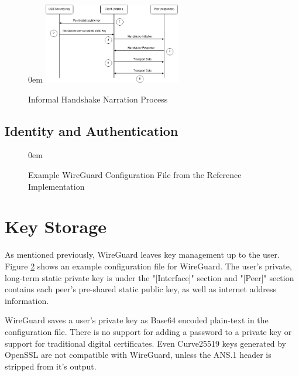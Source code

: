 \documentclass [11pt, proquest] {uwthesis}[2020/02/24]
\begin{document}
\begin{figure}
\itemsep0em 
\includegraphics[width=6cm]{paper/images/Process_Diagram.png}
\caption{Informal Handshake Narration Process}
\label{fig:handshake_process}
\end{figure}

\subsection {Identity and Authentication}
\label{identity}

\begin{figure}
\itemsep0em 
\caption{Example WireGuard Configuration File from the Reference Implementation}
\label{fig:wg_config}
\end{figure}

\section{Key Storage}
As mentioned previously, WireGuard leaves key management up to the user.
Figure \ref{fig:wg_config} shows an example configuration file for WireGuard. The user's private, long-term static private key is under the "[Interface]" section and "[Peer]" section contains each peer's pre-shared static public key, as well as internet address information.

WireGuard saves a user's private key as Base64 encoded plain-text in the configuration file. There is no support for adding a password to a private key or support for traditional digital certificates. Even Curve25519 keys generated by OpenSSL are not compatible with WireGuard, unless the ANS.1 header is stripped from it's output.
\end{document}

